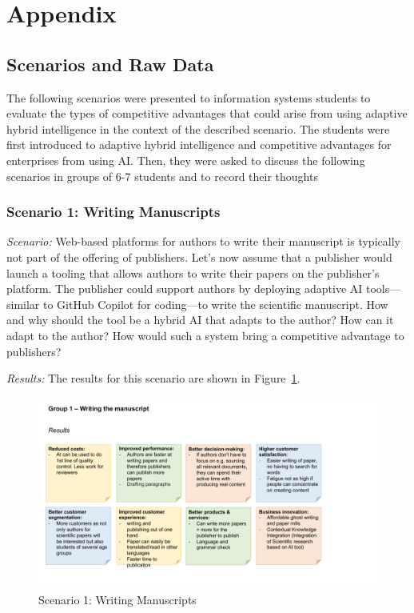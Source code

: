 \section{Appendix}

\subsection{Scenarios and Raw Data}
\label{appendix:scenarios}

The following scenarios were presented to information systems students to evaluate the types of
competitive advantages that could arise from using adaptive hybrid intelligence in the context
of the described scenario. The students were first introduced to adaptive hybrid intelligence and
competitive advantages for enterprises from using AI. Then, they were asked to discuss the following
scenarios in groups of 6-7 students and to record their thoughts


\subsubsection{Scenario 1: Writing Manuscripts}

\textit{Scenario:}
Web-based platforms for authors to write their manuscript is typically not part of the offering of
publishers. Let's now assume that a publisher would launch a tooling that allows authors to write
their papers on the publisher's platform. The publisher could support authors by deploying adaptive
AI tools---similar to GitHub Copilot for coding---to write the scientific manuscript. How and why
should the tool be a hybrid AI that adapts to the author? How can it adapt to the author? How would
such a system bring a competitive advantage to publishers?

\vspace{0.1cm}
\noindent\textit{Results:} The results for this scenario are shown in Figure~\ref{fig:appendix:fig1}.

\begin{figure}[h!]
    \centering
    \caption{Scenario 1: Writing Manuscripts}
    \label{fig:appendix:fig1}
    \includegraphics[width=\textwidth]{figures/results_1.pdf}
\end{figure}


